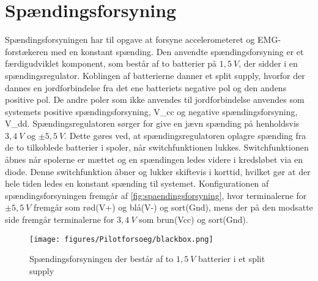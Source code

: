 \section{Spændingsforsyning}
Spændingsforsyningen har til opgave at forsyne accelerometeret og EMG-forstækeren med en konstant spænding. Den anvendte spændingsforsyning er et færdigudviklet komponent, som består af to batterier på $1,5~V$, der sidder i en spændingsregulator. Koblingen af batterierne danner et split supply, hvorfor der dannes en jordforbindelse fra det ene batteriets negative pol og den andens positive pol. De andre poler som ikke anvendes til jordforbindelse anvendes som systemets positive spændingsforsyning, {V}_{cc} og negative spændingsforsyning, {V}_{dd}.
Spændingsregulatoren sørger for give en jævn spænding på henholdsvis $3,4~V$ og $\pm 5,5~V$. Dette gøres ved, at spændingsregulatoren oplagre spænding fra de to tilkoblede batterier i spoler, når switchfunktionen lukkes. Switchfunktionen åbnes når spolerne er mættet og en spændingen ledes videre i kredsløbet via en diode. Denne switchfunktion åbner og lukker skiftevis i korttid, hvilket gør at der hele tiden ledes en konstant spænding til systemet. 
Konfigurationen af spændingsforsyningen fremgår af \autoref{fig:spaendingsforsyning}, hvor terminalerne for $\pm 5,5~V$ fremgår som rød(V+) og blå(V-) og sort(Gnd), mens der på den modsatte side fremgår terminalerne for $3,4~V$ som brun(Vcc) og sort(Gnd). 


\begin{figure}[H]
\centering
\texttt{[image: figures/Pilotforsoeg/blackbox.png]}
\caption{Spændingsforsyningen der består af to $1,5~V$ batterier i et split supply}
\label{fig:spaendingsforsyning}
\end{figure}
